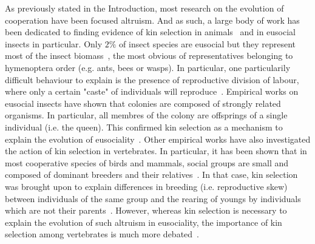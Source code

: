     As previously stated in the Introduction, most research on the evolution of cooperation have been focused altruism. And as such, a large body of work has been dedicated to finding evidence of kin selection in animals~\parencite{Bourke2014} and in eusocial insects in particular. Only $2\%$ of insect species are eusocial but they represent most of the insect biomass~\parencite{Wilson2008}, the most obvious of representatives belonging to hymenoptera order (e.g. ants, bees or wasps). In particular, one particularily difficult behaviour to explain is the presence of reproductive division of labour, where only a certain "caste" of individuals will reproduce~\parencite{Wilson1990}. Empirical works on eusocial insects have shown that colonies are composed of strongly related organisms. In particular, all membres of the colony are offsprings of a single individual (i.e. the queen). This confirmed kin selection as a mechanism to explain the evolution of eusociality~\parencite{Queller1998}. Other empirical works have also investigated the action of kin selection in vertebrates. In particular, it has been shown that in most cooperative species of birds and mammals, social groups are small and composed of dominant breeders and their relatives~\parencite{Dugatkin1997, Clutton-Brock2002}. In that case, kin selection was brought upon to explain differences in breeding (i.e. reproductive skew) between individuals of the same group and the rearing of youngs by individuals which are not their parents~\parencite{Bourke2011}. However, whereas kin selection is necessary to explain the evolution of such altruism in eusociality, the importance of kin selection among vertebrates is much more debated~\parencite{Griffin2003, Clutton-Brock2002}.

